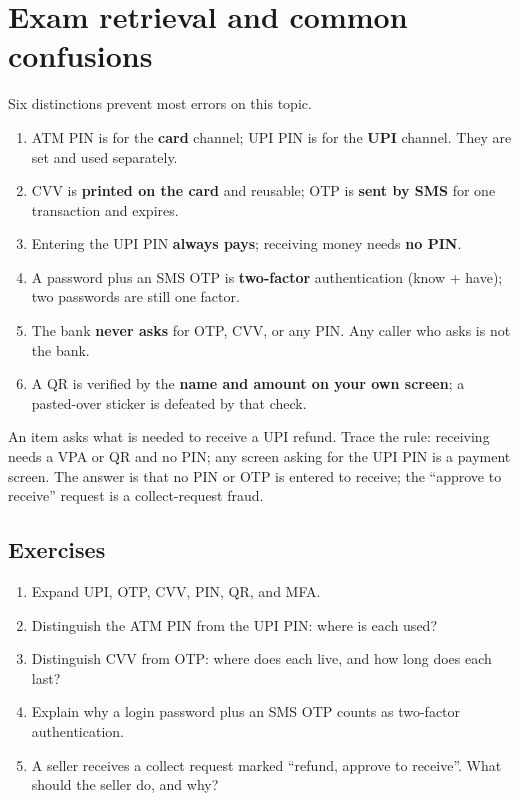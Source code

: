 \section{Exam retrieval and common confusions}
Six distinctions prevent most errors on this topic.
\begin{enumerate}
  \item ATM PIN is for the \textbf{card} channel; UPI PIN is for the
    \textbf{UPI} channel. They are set and used separately.
  \item CVV is \textbf{printed on the card} and reusable; OTP is
    \textbf{sent by SMS} for one transaction and expires.
  \item Entering the UPI PIN \textbf{always pays}; receiving money needs
    \textbf{no PIN}.
  \item A password plus an SMS OTP is \textbf{two-factor} authentication
    (know + have); two passwords are still one factor.
  \item The bank \textbf{never asks} for OTP, CVV, or any PIN. Any caller
    who asks is not the bank.
  \item A QR is verified by the \textbf{name and amount on your own
    screen}; a pasted-over sticker is defeated by that check.
\end{enumerate}

\begin{example}
An item asks what is needed to receive a UPI refund. Trace the rule:
receiving needs a VPA or QR and no PIN; any screen asking for the UPI PIN is
a payment screen. The answer is that no PIN or OTP is entered to receive;
the ``approve to receive'' request is a collect-request fraud.
\end{example}

\subsection*{Exercises}
\begin{enumerate}[label=\arabic*.]
  \item Expand UPI, OTP, CVV, PIN, QR, and MFA.
  \item Distinguish the ATM PIN from the UPI PIN: where is each used?
  \item Distinguish CVV from OTP: where does each live, and how long does
    each last?
  \item Explain why a login password plus an SMS OTP counts as two-factor
    authentication.
  \item A seller receives a collect request marked ``refund, approve to
    receive''. What should the seller do, and why?
\end{enumerate}

